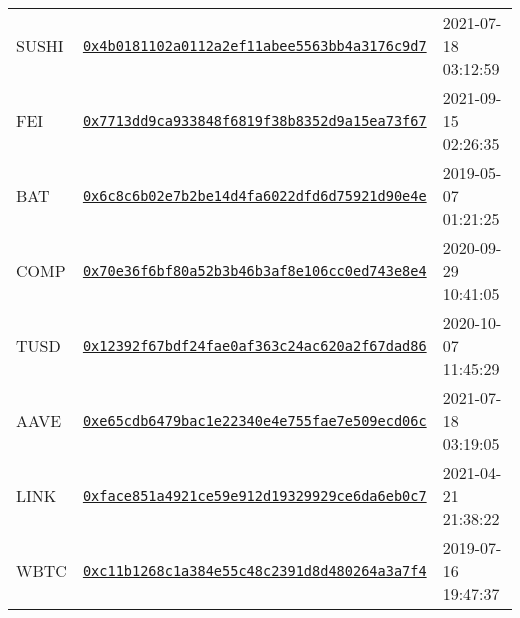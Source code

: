\begin{tabular}{l p{15cm} l}
SUSHI & \href{https://etherscan.io/address/0x4b0181102a0112a2ef11abee5563bb4a3176c9d7}{\tt 0x4b0181102a0112a2ef11abee5563bb4a3176c9d7} &          2021-07-18 03:12:59 \\
  FEI & \href{https://etherscan.io/address/0x7713dd9ca933848f6819f38b8352d9a15ea73f67}{\tt 0x7713dd9ca933848f6819f38b8352d9a15ea73f67} &          2021-09-15 02:26:35 \\
  BAT & \href{https://etherscan.io/address/0x6c8c6b02e7b2be14d4fa6022dfd6d75921d90e4e}{\tt 0x6c8c6b02e7b2be14d4fa6022dfd6d75921d90e4e} &          2019-05-07 01:21:25 \\
 COMP & \href{https://etherscan.io/address/0x70e36f6bf80a52b3b46b3af8e106cc0ed743e8e4}{\tt 0x70e36f6bf80a52b3b46b3af8e106cc0ed743e8e4} &          2020-09-29 10:41:05 \\
 TUSD & \href{https://etherscan.io/address/0x12392f67bdf24fae0af363c24ac620a2f67dad86}{\tt 0x12392f67bdf24fae0af363c24ac620a2f67dad86} &          2020-10-07 11:45:29 \\
 AAVE & \href{https://etherscan.io/address/0xe65cdb6479bac1e22340e4e755fae7e509ecd06c}{\tt 0xe65cdb6479bac1e22340e4e755fae7e509ecd06c} &          2021-07-18 03:19:05 \\
 LINK & \href{https://etherscan.io/address/0xface851a4921ce59e912d19329929ce6da6eb0c7}{\tt 0xface851a4921ce59e912d19329929ce6da6eb0c7} &          2021-04-21 21:38:22 \\
 WBTC & \href{https://etherscan.io/address/0xc11b1268c1a384e55c48c2391d8d480264a3a7f4}{\tt 0xc11b1268c1a384e55c48c2391d8d480264a3a7f4} &          2019-07-16 19:47:37 \\
\bottomrule
\end{tabular}
